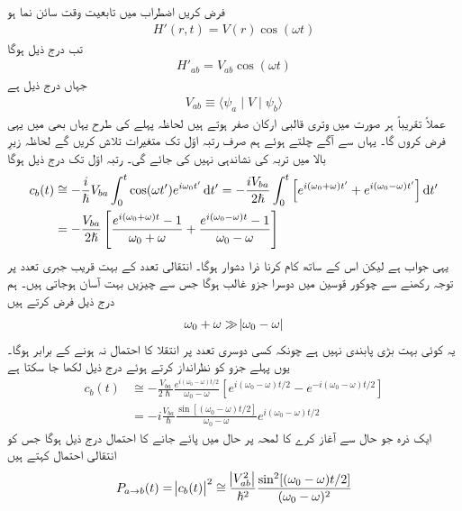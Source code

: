 فرض کریں اضطراب میں تابعیت وقت سائن نما ہو 
\begin{align}
	H'(r, t) = V(r)\cos(\omega t)
\end{align}
تب درج ذیل ہوگا
\begin{align}
	H'_{ab}=V_{ab}\cos(\omega t)
\end{align}
جہاں  درج ذیل ہے
\begin{align}
	V_{ab}\equiv\langle\psi_a\mid V\mid\psi_b\rangle
\end{align}
عملاً تقریباً ہر صورت میں وتری قالبی ارکان صفر ہوتے ہیں لحاظہ پہلے کی طرح یہاں بھی میں یہی فرض کروں گا۔ یہاں سے آگے چلتے ہوئے ہم صرف رتبہ اوّل تک متغیرات تلاش کریں گے لحاظہ زیرِ بالا میں تربہ کی نشاندہی نہیں کی جائے گی۔ رتبہ اوّل تک درج ذیل ہوگا  
\begin{align}
	c_b(t) &\cong-\frac{i}{\hslash}V_{ba}\int_{0}^{t}\cos(\omega t')e^{i\omega_0 t'}\dif t' = -\frac{iV_{ba}}{2\hslash}\int_{0}^{t}\left[e^{i(\omega_0+\omega)t'}+e^{i(\omega_0-\omega)t'}\right]\dif t' \nonumber \\
	&=-\frac{V_{ba}}{2\hslash}\left[\frac{e^{i(\omega_0+\omega)t}-1}{\omega_0+\omega}+\frac{e^{i(\omega_0-\omega)t}-1}{\omega_0-\omega}\right]
\end{align}
یہی جواب ہے لیکن اس کے ساتھ کام کرنا ذرا دشوار ہوگا۔ انتقالی تعدد  کے بہت قریب جبری تعدد  پر توجہ رکھنے سے چوکور قوسین میں دوسرا جزو غالب ہوگا جس سے چیزیں بہت آسان ہوجاتی ہیں۔ ہم درج ذیل فرض کرتے ہیں
\begin{align}
	\omega_0+\omega\gg\abs{\omega_0-\omega}
\end{align}
یہ کوئی بہت بڑی پابندی نہیں ہے چونکہ کسی دوسری تعدد پر انتقلا کا احتمال نہ ہونے کے برابر ہوگا۔ یوں پہلے جزو کو نظرانداز کرتے ہوئے درج ذیل لکھا جا سکتا ہے
\begin{align}
	c_b(t) &\cong-\frac{V_{ba}}{2\hslash}\frac{e^{i(\omega_0-\omega)t/2}}{\omega_0-\omega}\left[e^{i(\omega_0-\omega)t/2}-e^{-i(\omega_0-\omega)t/2}\right]\nonumber \\
	&=-i\frac{V_{ba}}{\hslash}\frac{\sin[(\omega_0-\omega)t/2]}{\omega_0-\omega}e^{i(\omega_0-\omega)t/2}
\end{align}
ایک ذرہ جو حال  سے آغاز کرے کا لمحہ پر حال  میں پائے جانے کا احتمال درج ذیل ہوگا جس کو انتقالی احتمال کہتے ہیں 
\begin{align}
	P_{a\to b}(t)=\abs{c_b(t)}^2\cong\frac{\abs{V_{ab}^2}}{\hslash^2}\frac{\sin^2[(\omega_0-\omega)t/2]}{(\omega_0-\omega)^2}
\end{align}
